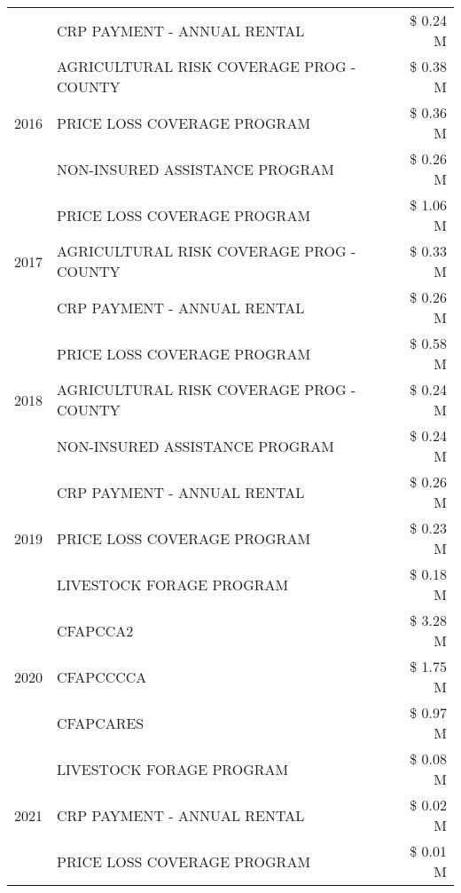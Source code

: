 \begin{tabular}{llr}
 & CRP PAYMENT - ANNUAL RENTAL & \$ 0.24 M \\
\cline{1-3}
\multirow[t]{3}{*}{2016} & AGRICULTURAL RISK COVERAGE PROG - COUNTY & \$ 0.38 M \\
 & PRICE LOSS COVERAGE PROGRAM & \$ 0.36 M \\
 & NON-INSURED ASSISTANCE PROGRAM & \$ 0.26 M \\
\cline{1-3}
\multirow[t]{3}{*}{2017} & PRICE LOSS COVERAGE PROGRAM & \$ 1.06 M \\
 & AGRICULTURAL RISK COVERAGE PROG - COUNTY & \$ 0.33 M \\
 & CRP PAYMENT - ANNUAL RENTAL & \$ 0.26 M \\
\cline{1-3}
\multirow[t]{3}{*}{2018} & PRICE LOSS COVERAGE PROGRAM & \$ 0.58 M \\
 & AGRICULTURAL RISK COVERAGE PROG - COUNTY & \$ 0.24 M \\
 & NON-INSURED ASSISTANCE PROGRAM & \$ 0.24 M \\
\cline{1-3}
\multirow[t]{3}{*}{2019} & CRP PAYMENT - ANNUAL RENTAL & \$ 0.26 M \\
 & PRICE LOSS COVERAGE PROGRAM & \$ 0.23 M \\
 & LIVESTOCK FORAGE PROGRAM & \$ 0.18 M \\
\cline{1-3}
\multirow[t]{3}{*}{2020} & CFAPCCA2 & \$ 3.28 M \\
 & CFAPCCCCA & \$ 1.75 M \\
 & CFAPCARES & \$ 0.97 M \\
\cline{1-3}
\multirow[t]{3}{*}{2021} & LIVESTOCK FORAGE PROGRAM & \$ 0.08 M \\
 & CRP PAYMENT - ANNUAL RENTAL & \$ 0.02 M \\
 & PRICE LOSS COVERAGE PROGRAM & \$ 0.01 M \\
\cline{1-3}
\bottomrule
\end{tabular}
